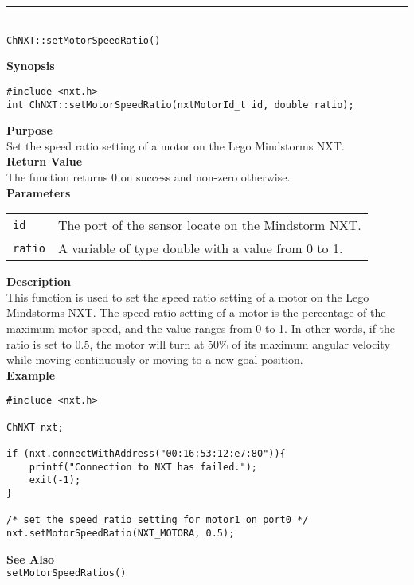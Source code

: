\noindent
\vspace{5pt}
\rule{4.5in}{0.015in}\\
\noindent
{\LARGE \texttt{ChNXT::setMotorSpeedRatio()} }\\


\noindent
{\bf Synopsis}
\begin{lstlisting}
#include <nxt.h>
int ChNXT::setMotorSpeedRatio(nxtMotorId_t id, double ratio);
\end{lstlisting}

\noindent
{\bf Purpose}\\
Set the speed ratio setting of a motor on the Lego Mindstorms NXT.\\

\noindent
{\bf Return Value}\\
The function returns 0 on success and non-zero otherwise.\\

\noindent
{\bf Parameters}\\
\vspace{-0.1in}
\begin{description}
\item
\begin{tabular}{ p{20mm}p{135mm} }
\texttt{id}&The port of the sensor locate on the Mindstorm NXT.\\
\texttt{ratio}&A variable of type double with a value from 0 to 1.\\
\end{tabular}
\end{description}

\noindent
{\bf Description}\\
This function is used to set the speed ratio setting of a motor on
the Lego Mindstorms NXT. The speed ratio setting of a motor is the
percentage of the maximum motor speed, and the value ranges from 
0 to 1. In other words, if the ratio is set to 0.5, the motor will
turn at 50\% of its maximum angular velocity while moving 
continuously or moving to a new goal position.\\

\noindent
{\bf Example}
\begin{lstlisting}
#include <nxt.h> 

ChNXT nxt;

if (nxt.connectWithAddress("00:16:53:12:e7:80")){
    printf("Connection to NXT has failed.");
    exit(-1);
}
    
/* set the speed ratio setting for motor1 on port0 */
nxt.setMotorSpeedRatio(NXT_MOTORA, 0.5);
\end{lstlisting}
\noindent
{\bf See Also}\\
\texttt{setMotorSpeedRatios()}\\
